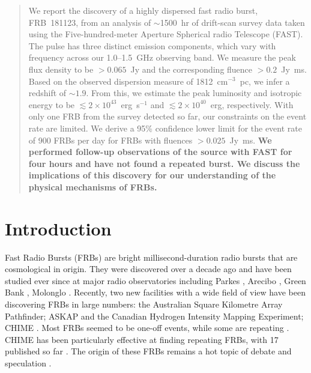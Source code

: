 
\begin{abstract}
We report the discovery of a highly dispersed fast radio burst, FRB~181123, from an analysis of $\sim$1500~hr of drift-scan survey data taken using the Five-hundred-meter Aperture Spherical radio Telescope (FAST). The pulse has three distinct emission components, which vary with frequency across our 1.0--1.5~GHz observing band. We measure the peak flux density to be $>0.065$~Jy and the corresponding fluence $>0.2$~Jy~ms. Based on the observed dispersion measure of 1812~cm$^{-3}$~pc, we infer a redshift of $\sim 1.9$. From this, we estimate the peak luminosity and
isotropic energy to be $\lesssim 2\times10^{43}$~erg~s$^{-1}$ and  $\lesssim 2\times10^{40}$~erg, respectively. With only one FRB from the survey detected so far, our constraints on the event rate are limited. We derive a 95\% confidence lower limit for the event rate of 900 FRBs per day for FRBs with fluences $>0.025$~Jy~ms. 
{\bf We performed follow-up observations of the source with FAST for four hours and have not found a repeated burst. We discuss the implications of this discovery for our understanding of the physical mechanisms of FRBs.}
\end{abstract}

\section{Introduction}
\label{sec:intro}
Fast Radio Bursts (FRBs) are bright millisecond-duration radio bursts that are cosmological in origin. They were discovered over a decade ago \citep{lbm+07} and have been studied ever since at major radio observatories including Parkes \citep{lbm+07,ksk+12,tsb+13,zhd+19}, Arecibo  \citep{sch+14}, Green Bank \citep{mkl+15}, Molonglo \citep{cfb+17, ffb+18}.
Recently, two new facilities with a wide field of view have been discovering FRBs in large numbers: the Australian Square Kilometre Array Pathfinder; ASKAP \citep{smb+18} and the Canadian Hydrogen Intensity Mapping Experiment; CHIME \citep{chime}.
Most FRBs seemed to be one-off events, while some are repeating \citep{ssh+16}. 
CHIME has been particularly effective at finding repeating FRBs, with 17 published so far \citep{chime_repeater, chime_8}. %
The origin of these FRBs remains a hot topic of debate and speculation \citep{pww+19}.

